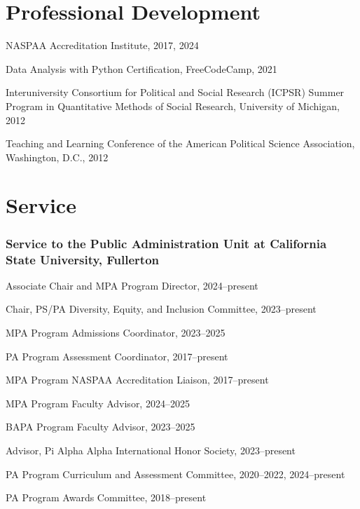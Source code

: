 \documentclass[12pt,letterpaper]{article}
\renewenvironment{itemize}{
  \begin{list}{}{
    \setlength{\leftmargin}{1.5em}
    \setlength{\itemsep}{0.25em}
    \setlength{\parskip}{0pt}
    \setlength{\parsep}{0.25em}
  }
}{
  \end{list}
}
\begin{document}
\section*{Professional Development}
\begin{itemize}\leftmargin=2pt\itemindent=-15pt
  \item NASPAA Accreditation Institute, 2017, 2024
  \item Data Analysis with Python Certification, FreeCodeCamp, 2021
  \item Interuniversity Consortium for Political and Social Research (ICPSR) Summer Program in Quantitative Methods of Social Research, University of Michigan, 2012
  \item Teaching and Learning Conference of the American Political Science Association, Washington, D.C., 2012
\end{itemize}

\section*{Service}

\subsubsection*{Service to the Public Administration Unit at California State University, Fullerton}
\begin{itemize}\leftmargin=2pt\itemindent=-15pt
    \item Associate Chair and MPA Program Director, 2024--present
    \item Chair, PS/PA Diversity, Equity, and Inclusion Committee, 2023--present
    \item MPA Program Admissions Coordinator, 2023--2025
    \item PA Program Assessment Coordinator, 2017--present
    \item MPA Program NASPAA Accreditation Liaison, 2017--present
    \item MPA Program Faculty Advisor, 2024--2025
    \item BAPA Program Faculty Advisor, 2023--2025
    \item Advisor, Pi Alpha Alpha International Honor Society, 2023--present
    \item PA Program Curriculum and Assessment Committee, 2020--2022, 2024--present
    \item PA Program Awards Committee, 2018--present
\end{itemize}
\end{document}
